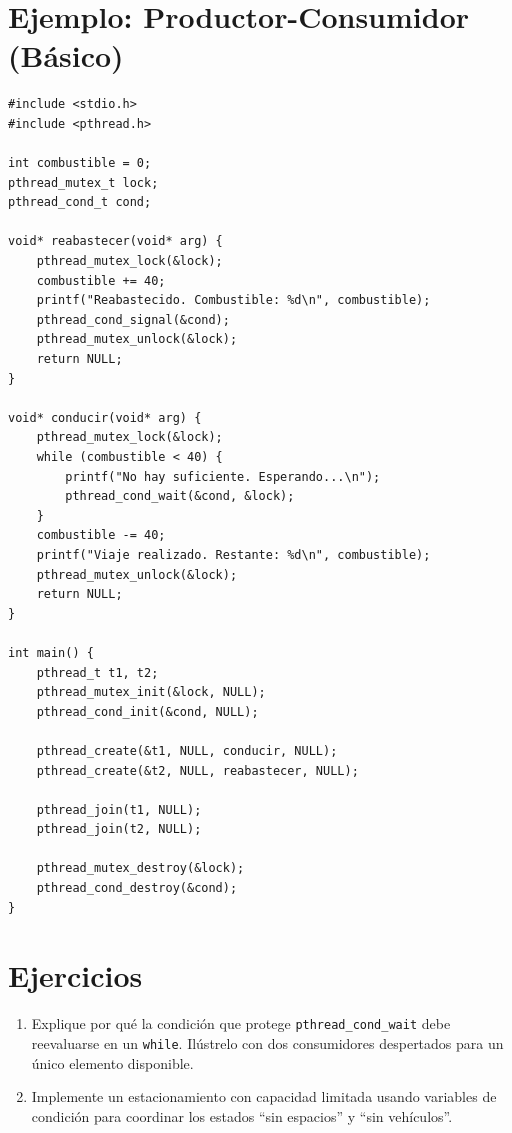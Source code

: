 \documentclass[12pt,a4paper]{article}
\begin{document}
\section{Ejemplo: Productor-Consumidor (Básico)}
\begin{lstlisting}
#include <stdio.h>
#include <pthread.h>

int combustible = 0;
pthread_mutex_t lock;
pthread_cond_t cond;

void* reabastecer(void* arg) {
    pthread_mutex_lock(&lock);
    combustible += 40;
    printf("Reabastecido. Combustible: %d\n", combustible);
    pthread_cond_signal(&cond);
    pthread_mutex_unlock(&lock);
    return NULL;
}

void* conducir(void* arg) {
    pthread_mutex_lock(&lock);
    while (combustible < 40) {
        printf("No hay suficiente. Esperando...\n");
        pthread_cond_wait(&cond, &lock);
    }
    combustible -= 40;
    printf("Viaje realizado. Restante: %d\n", combustible);
    pthread_mutex_unlock(&lock);
    return NULL;
}

int main() {
    pthread_t t1, t2;
    pthread_mutex_init(&lock, NULL);
    pthread_cond_init(&cond, NULL);

    pthread_create(&t1, NULL, conducir, NULL);
    pthread_create(&t2, NULL, reabastecer, NULL);

    pthread_join(t1, NULL);
    pthread_join(t2, NULL);

    pthread_mutex_destroy(&lock);
    pthread_cond_destroy(&cond);
}
\end{lstlisting}

\section{Ejercicios}
\begin{enumerate}
    \item Explique por qué la condición que protege \texttt{pthread\_cond\_wait} debe reevaluarse en un \texttt{while}. Ilústrelo con dos consumidores despertados para un único elemento disponible.
    \item Implemente un estacionamiento con capacidad limitada usando variables de condición para coordinar los estados ``sin espacios'' y ``sin vehículos''.
\end{enumerate}
\end{document}
